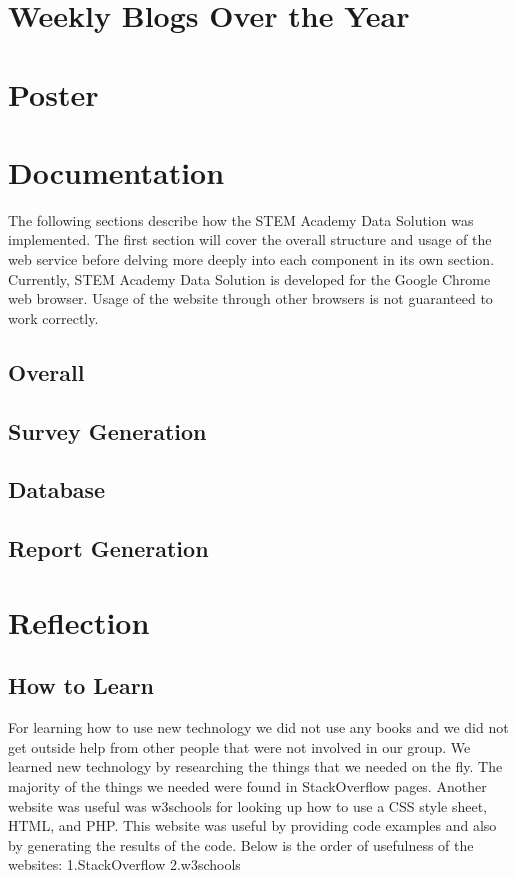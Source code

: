 \documentclass[letterpaper,10pt,serif,draftclsnofoot,onecolumn,compsoc,titlepage]{IEEEtran}
\begin{document}
\section{Weekly Blogs Over the Year}




\section{Poster}

\section{Documentation}
The following sections describe how the STEM Academy Data Solution was implemented.
The first section will cover the overall structure and usage of the web service before delving more deeply into each component in its own section.
Currently, STEM Academy Data Solution is developed for the Google Chrome web browser.
Usage of the website through other browsers is not guaranteed to work correctly.
\subsection{Overall}

\subsection{Survey Generation}

\subsection{Database}

\subsection{Report Generation}


\section{Reflection}
\subsection{How to Learn}
For learning how to use new technology we did not use any books and we did not get outside help from other people that were not involved in our group.
We learned new technology by researching the things that we needed on the fly.
The majority of the things we needed were found in StackOverflow pages.
Another website was useful was w3schools for looking up how to use a CSS style sheet, HTML, and PHP.
This website was useful by providing code examples and also by generating the results of the code. 
Below is the order of usefulness of the websites:
1.StackOverflow
2.w3schools
\end{document}
